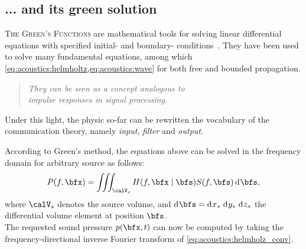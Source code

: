 \subsection{... and its green solution}
\textsc{The Green's Functions} are mathematical tools for solving linear differential equations with specified initial- and boundary- conditions~.
They have been used to solve many fundamental equations, among which \cref{eq:acoustics:helmholtz,eq:acoustics:wave} for both free and bounded propagation.
\begin{quote}
    \textit{
    They can be seen as a concept analogous to
    \\ \emph{impulse responses}
    in signal processing.
    }
\end{quote}
Under this light, the physic so-far can be rewritten  the vocabulary of the communication theory, namely \textit{input}, \textit{filter} and \textit{output}.

According to Green's method, the equations above can be solved in the frequency domain for arbitrary source as follows:
\begin{equation}
    \label{eq:acoustics:helmholz_conv}
    P(f, \positionMicrophone) = \iiint_{\volume_\contSource} H(f, \positionMicrophone \mid \positionSource) S(f, \positionSource) \kdiff\positionSource
    ,
\end{equation}
where $\volume_\contSource$ denotes the source volume,
and  $\kdiff\positionSource =  \kdiff{x_\contSource}\,\kdiff{y_\contSource}\,\kdiff{z_\contSource}$ the  differential  volume element at position $\positionSource$.
\\The requested sound pressure $\pressureSpaceTime$ can now be computed by taking the frequency-directional inverse Fourier transform of \cref{eq:acoustics:helmholz_conv}.

